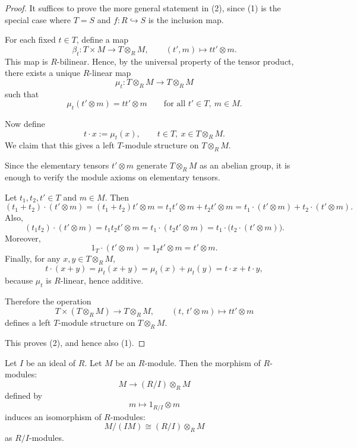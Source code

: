 \begin{proof}
    It suffices to prove the more general statement in \textup{(2)}, since \textup{(1)} is the
    special case where $T=S$ and $f:R\hookrightarrow S$ is the inclusion map.

    For each fixed $t\in T$, define a map
    \[
        \beta_t:T\times M \longrightarrow T\otimes_R M,\qquad (t',m)\longmapsto tt'\otimes m.
    \]
    This map is $R$-bilinear. Hence, by the universal property of the tensor product,
    there exists a unique $R$-linear map
    \[
        \mu_t:T\otimes_R M\longrightarrow T\otimes_R M
    \]
    such that
    \[
        \mu_t(t'\otimes m)=tt'\otimes m
        \qquad\text{for all }t'\in T,\ m\in M.
    \]

    Now define
    \[
        t\cdot x:=\mu_t(x),\qquad t\in T,\ x\in T\otimes_R M.
    \]
    We claim that this gives a left $T$-module structure on $T\otimes_R M$.

    Since the elementary tensors $t'\otimes m$ generate $T\otimes_R M$ as an abelian
    group, it is enough to verify the module axioms on elementary tensors.

    Let $t_1,t_2,t'\in T$ and $m\in M$. Then
    \[
        (t_1+t_2)\cdot (t'\otimes m)
        =(t_1+t_2)t'\otimes m
        =t_1t'\otimes m+t_2t'\otimes m
        =t_1\cdot (t'\otimes m)+t_2\cdot (t'\otimes m).
    \]
    Also,
    \[
        (t_1t_2)\cdot (t'\otimes m)
        =t_1t_2t'\otimes m
        =t_1\cdot (t_2t'\otimes m)
        =t_1\cdot \bigl(t_2\cdot (t'\otimes m)\bigr).
    \]
    Moreover,
    \[
        1_T\cdot (t'\otimes m)=1_Tt'\otimes m=t'\otimes m.
    \]
    Finally, for any $x,y\in T\otimes_R M$,
    \[
        t\cdot (x+y)=\mu_t(x+y)=\mu_t(x)+\mu_t(y)=t\cdot x+t\cdot y,
    \]
    because $\mu_t$ is $R$-linear, hence additive.

    Therefore the operation
    \[
        T\times (T\otimes_R M)\longrightarrow T\otimes_R M,\qquad
        (t,\,t'\otimes m)\longmapsto tt'\otimes m
    \]
    defines a left $T$-module structure on $T\otimes_R M$.

    This proves \textup{(2)}, and hence also \textup{(1)}.
\end{proof}

\begin{proposition}
    Let $I$ be an ideal of $R$. Let $M$ be an $R$-module. Then the morphism of $R$-modules:
    \[
        M \to (R/I) \otimes_R M
    \]
    defined by
    \[
        m \mapsto 1_{R/I} \otimes m
    \]
    induces an isomorphism of $R$-modules:
    \[
        M/(IM) \cong (R/I) \otimes_R M
    \]
    as $R/I$-modules.
\end{proposition}

